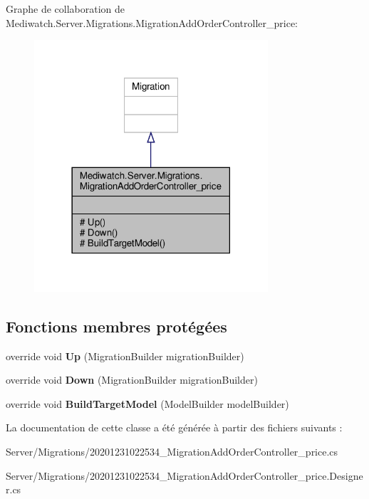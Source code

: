 Graphe de collaboration de Mediwatch.\+Server.\+Migrations.\+Migration\+Add\+Order\+Controller\+\_\+price\+:
\nopagebreak
\begin{figure}[H]
\begin{center}
\leavevmode
\includegraphics[width=246pt]{class_mediwatch_1_1_server_1_1_migrations_1_1_migration_add_order_controller__price__coll__graph}
\end{center}
\end{figure}
\subsection*{Fonctions membres protégées}
\begin{DoxyCompactItemize}
\item 
\mbox{\label{class_mediwatch_1_1_server_1_1_migrations_1_1_migration_add_order_controller__price_a2e7a36d52cd9d920e4793c21bfa5cfc2}} 
override void {\bfseries Up} (Migration\+Builder migration\+Builder)
\item 
\mbox{\label{class_mediwatch_1_1_server_1_1_migrations_1_1_migration_add_order_controller__price_aa97cef104279dc1e12f5494092fb40b5}} 
override void {\bfseries Down} (Migration\+Builder migration\+Builder)
\item 
\mbox{\label{class_mediwatch_1_1_server_1_1_migrations_1_1_migration_add_order_controller__price_afe9cdddc6bcca8640db6e8794e482c0c}} 
override void {\bfseries Build\+Target\+Model} (Model\+Builder model\+Builder)
\end{DoxyCompactItemize}


La documentation de cette classe a été générée à partir des fichiers suivants \+:\begin{DoxyCompactItemize}
\item 
Server/\+Migrations/20201231022534\+\_\+\+Migration\+Add\+Order\+Controller\+\_\+price.\+cs\item 
Server/\+Migrations/20201231022534\+\_\+\+Migration\+Add\+Order\+Controller\+\_\+price.\+Designer.\+cs\end{DoxyCompactItemize}

